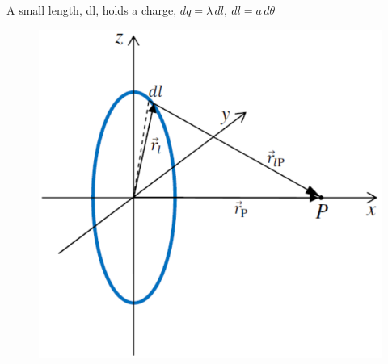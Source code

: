 \documentclass[a4paper, 11pt, fleqn, normalem]{report}
\begin{document}
A small length, dl, holds a charge, $dq = \lambda\,dl,~dl = a\,d\theta$

\begin{figure}[H]
    \includegraphics[scale=0.4]{D1.png}
\end{figure}
\end{document}
